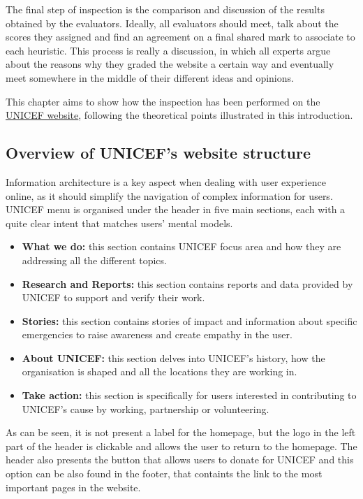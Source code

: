 The final step of inspection is the comparison and discussion of the results obtained by the evaluators. Ideally, all evaluators should meet, talk about the scores they assigned and find an agreement on a final shared mark to associate to each heuristic. This process is really a discussion, in which all experts argue about the reasons why they graded the website a certain way and eventually meet somewhere in the middle of their different ideas and opinions.

This chapter aims to show how the inspection has been performed on the \href{https://www.unicef.org/}{UNICEF website}, following the theoretical points illustrated in this introduction.
\clearpage

\subsection{Overview of UNICEF's website structure}

Information architecture is a key aspect when dealing with user experience online, as it should simplify the navigation of complex information for users. UNICEF menu is organised under the header in five main sections, each with a quite clear intent that matches users’ mental models.

\begin{itemize}
    \item \textbf{What we do:} this section contains UNICEF focus area and how they are addressing all the different topics.
    \item \textbf{Research and Reports:} this section contains reports and data provided by UNICEF to support and verify their work.
    \item \textbf{Stories:} this section contains stories of impact and information about specific emergencies to raise awareness and create empathy in the user.
    \item \textbf{About UNICEF:} this section delves into UNICEF's history, how the organisation is shaped and all the locations they are working in.
    \item \textbf{Take action:} this section is specifically for users interested in contributing to UNICEF's cause by working, partnership or volunteering.
\end{itemize}

As can be seen, it is not present a label for the homepage, but the logo in the left part of the header is clickable and allows the user to return to the homepage. The header also presents the button that allows users to donate for UNICEF and this option can be also found in the footer, that containts the link to the most important pages in the website.

